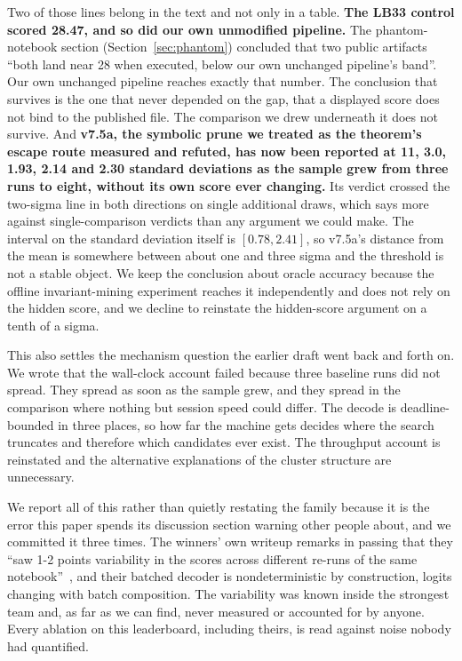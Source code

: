 \documentclass[11pt]{article}
\begin{document}
Two of those lines belong in the text and not only in a table. \textbf{The LB33 control
scored 28.47, and so did our own unmodified pipeline.} The phantom-notebook section
(Section~\ref{sec:phantom}) concluded that two public artifacts ``both land near 28 when executed,
below our own unchanged pipeline's band''. Our own unchanged pipeline reaches exactly that number.
The conclusion that survives is the one that never depended on the gap, that a displayed score does
not bind to the published file. The comparison we drew underneath it does not survive. And
\textbf{v7.5a, the symbolic prune we treated as the theorem's escape route measured and refuted,
has now been reported at 11, 3.0, 1.93, 2.14 and 2.30 standard deviations as the sample grew from
three runs to eight, without its own score ever changing.} Its verdict crossed the two-sigma line in
both directions on single additional draws, which says more against single-comparison
verdicts than any argument we could make. The interval on the standard deviation itself is
$[0.78, 2.41]$, so v7.5a's distance from the mean is somewhere between about one and three
sigma and the threshold is not a stable object. We keep the conclusion about oracle accuracy because
the offline invariant-mining experiment reaches it independently and does not rely on the hidden
score, and we decline to reinstate the hidden-score argument on a tenth of a sigma.

This also settles the mechanism question the earlier draft went back and forth on. We wrote that the
wall-clock account failed because three baseline runs did not spread. They spread as soon as the
sample grew, and they spread in the comparison where nothing but session speed could differ. The
decode is deadline-bounded in three places, so how far the machine gets decides where the search
truncates and therefore which candidates ever exist. The throughput account is reinstated and the
alternative explanations of the cluster structure are unnecessary.

We report all of this rather than quietly restating the family because it is the error this paper
spends its discussion section warning other people about, and we committed it three times.
The winners' own writeup remarks in passing that
they ``saw 1-2 points variability in the scores across different re-runs of the same
notebook''~\cite{nvarc}, and their batched decoder is nondeterministic by construction, logits
changing with batch composition. The variability was known inside the strongest team and, as far as
we can find, never measured or accounted for by anyone. Every ablation on this leaderboard,
including theirs, is read against noise nobody had quantified.
\end{document}
